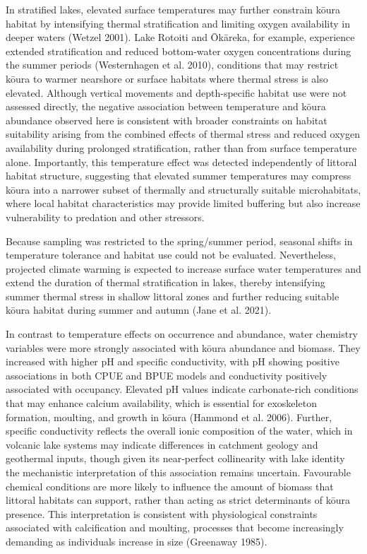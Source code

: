 \documentclass[
  12pt,
  a4paper,
]{scrbook}
\begin{document}
In stratified lakes, elevated surface temperatures may further constrain
kōura habitat by intensifying thermal stratification and limiting oxygen
availability in deeper waters (Wetzel 2001). Lake Rotoiti and Ōkāreka,
for example, experience extended stratification and reduced bottom-water
oxygen concentrations during the summer periods (Westernhagen et al.
2010), conditions that may restrict kōura to warmer nearshore or surface
habitats where thermal stress is also elevated. Although vertical
movements and depth-specific habitat use were not assessed directly, the
negative association between temperature and kōura abundance observed
here is consistent with broader constraints on habitat suitability
arising from the combined effects of thermal stress and reduced oxygen
availability during prolonged stratification, rather than from surface
temperature alone. Importantly, this temperature effect was detected
independently of littoral habitat structure, suggesting that elevated
summer temperatures may compress kōura into a narrower subset of
thermally and structurally suitable microhabitats, where local habitat
characteristics may provide limited buffering but also increase
vulnerability to predation and other stressors.

Because sampling was restricted to the spring/summer period, seasonal
shifts in temperature tolerance and habitat use could not be evaluated.
Nevertheless, projected climate warming is expected to increase surface
water temperatures and extend the duration of thermal stratification in
lakes, thereby intensifying summer thermal stress in shallow littoral
zones and further reducing suitable kōura habitat during summer and
autumn ({Jane et al.} 2021).

In contrast to temperature effects on occurrence and abundance, water
chemistry variables were more strongly associated with kōura abundance
and biomass. They increased with higher pH and specific conductivity,
with pH showing positive associations in both CPUE and BPUE models and
conductivity positively associated with occupancy. Elevated pH values
indicate carbonate-rich conditions that may enhance calcium
availability, which is essential for exoskeleton formation, moulting,
and growth in kōura (Hammond et al. 2006). Further, specific
conductivity reflects the overall ionic composition of the water, which
in volcanic lake systems may indicate differences in catchment geology
and geothermal inputs, though given its near-perfect collinearity with
lake identity the mechanistic interpretation of this association remains
uncertain. Favourable chemical conditions are more likely to influence
the amount of biomass that littoral habitats can support, rather than
acting as strict determinants of kōura presence. This interpretation is
consistent with physiological constraints associated with calcification
and moulting, processes that become increasingly demanding as
individuals increase in size (Greenaway 1985).
\end{document}
